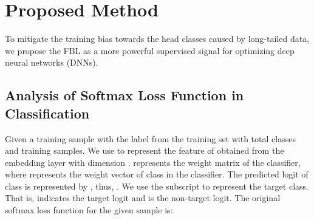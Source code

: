 \documentclass{article}
\def\etal{\emph{et al.}}
\begin{document}
\iffalse
\subsection{Loss Optimization}
Class imbalance can also be solved by modifying the loss, Li \etal~\cite{li2002perceptron} submitted to add \textit{per-class margins} into the hinge loss because the separator is supposed to be closer to a dominant class, though Cao~\etal~\cite{cao2019learning} preferred to add it into the softmax cross-entropy, which imposed a margin between ``negative" labels and ``positive" labels. Separately, since ``positive" labels often obtain inhibitory gradient signals in the original softmax cross-entropy, Wang~\etal~\cite{wang2018additive} offered a method that adds a margin strategy to the target logit of softmax loss.

\subsection{Two-stage Imbalance Learning}
This method divides the training process into classifier learning and representation learning. Decoupling the learning of classifier head and representation are the latest popular solutions to long-tail learning. Decouple~\cite{kang2020decoupling} achieves advanced performance via properly re-balancing the classifiers. A cursory inspection of~\cite{menon21long, tang2020long} reveals that importing a post-process to adapt the prediction score can improve the two-stage ideas, having said that, such a two-stage structure demands tedious hyper-parameter tuning, especially in practice application.
\fi

\section{Proposed Method}
\label{sec:method}
To mitigate the training bias towards the head classes caused by long-tailed data, we propose the FBL as a more powerful supervised signal for optimizing deep neural networks (DNNs).

\subsection{Analysis of Softmax Loss Function in Classification}\label{sec:analysis}
Given a training sample  with the label  from the training set  with total  classes and  training samples. We use  to represent the feature of  obtained from the embedding layer with dimension .  represents the weight matrix of the classifier, where  represents the weight vector of class  in the classifier. The predicted logit of class  is represented by , thus, . We use the subscript  to represent the target class. That is,  indicates the target logit and  is the non-target logit. The original softmax loss function for the given sample  is:
\end{document}
